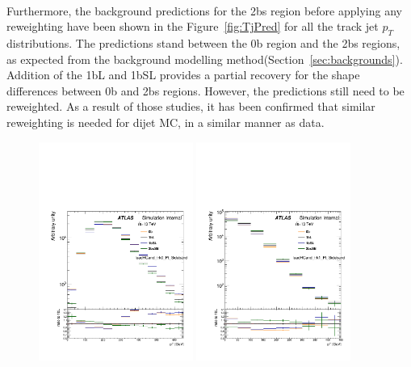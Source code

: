 \paragraph{}
Furthermore, the background predictions for the 2bs region before applying any reweighting have been shown in the Figure~\ref{fig:TjPred} for all the track jet $p_{T}$ distributions. The predictions stand between the 0b region and the 2bs regions, as expected from the background modelling method(Section~\ref{sec:backgrounds}). Addition of the 1bL and 1bSL provides a partial recovery for the shape differences between 0b and 2bs regions. However, the predictions still need to be reweighted. As a result of those studies, it has been confirmed that similar reweighting is needed for dijet MC, in a similar manner as data. 

\begin{figure}[htbp!]
\begin{center}
\includegraphics[angle=270, width=0.45\textwidth]{./figures/boosted/AppendixDijetMC/leadHCand_trk0_Pt_SidebandwoPr_data.pdf}
\includegraphics[angle=270, width=0.45\textwidth]{./figures/boosted/AppendixDijetMC/leadHCand_trk1_Pt_SidebandwoPr_data.pdf}

\end{center}
\end{figure}

